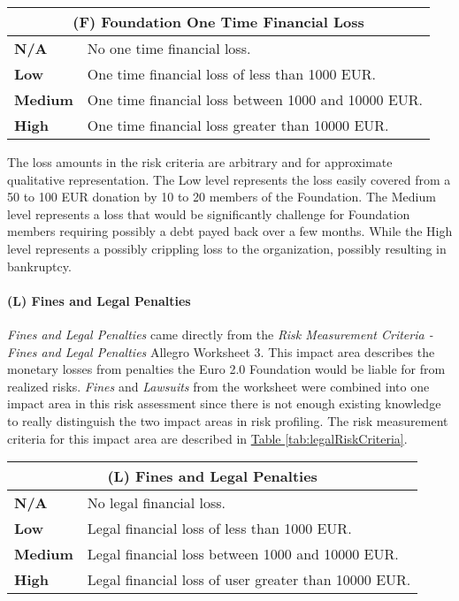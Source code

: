 \documentclass[12pt]{article} %
\newcommand{\hypertableref}[1]{\hyperref[#1]{Table \ref{#1}}}
\begin{document}
{\begin{center}
\begin{tabular}{ | l | p{12cm} | }
  \hline
  \multicolumn{2}{|c|}{\textbf{(F) Foundation One Time Financial Loss}}
  \\ \hline
  \textbf{N/A} & No one time financial loss.
  \\ \hline
  \textbf{Low} & One time financial loss of less than 1000 EUR.
  \\ \hline
  \textbf{Medium} & One time financial loss between 1000 and 10000 EUR.
  \\ \hline
  \textbf{High} & One time financial loss greater than 10000 EUR.
  \\ \hline
\end{tabular}
\end{center}
\label{tab:foundationFinancialLossRiskCriteria}

The loss amounts in the risk criteria are arbitrary and for approximate qualitative representation. The Low level represents the loss easily covered from a 50 to 100 EUR donation by 10 to 20 members of the Foundation. The Medium level represents a loss that would be significantly challenge for Foundation members requiring possibly a debt payed back over a few months. While the High level represents a possibly crippling loss to the organization, possibly resulting in bankruptcy.

\paragraph{(L) Fines and Legal Penalties}

\textit{Fines and Legal Penalties} came directly from the \textit{Risk Measurement Criteria - Fines and Legal Penalties} Allegro Worksheet 3. This impact area describes the monetary losses from penalties the Euro 2.0 Foundation would be liable for from realized risks. \textit{Fines} and \textit{Lawsuits} from the worksheet were combined into one impact area in this risk assessment since there is not enough existing knowledge to really distinguish the two impact areas in risk profiling. The risk measurement criteria for this impact area are described in \hypertableref{tab:legalRiskCriteria}.

\begin{center}
\begin{tabular}{ | l | p{12cm} | }
  \hline
  \multicolumn{2}{|c|}{\textbf{(L) Fines and Legal Penalties}}
  \\ \hline
  \textbf{N/A} & No legal financial loss.
  \\ \hline
  \textbf{Low} & Legal financial loss of less than 1000 EUR.
  \\ \hline
  \textbf{Medium} & Legal financial loss between 1000 and 10000 EUR.
  \\ \hline
  \textbf{High} & Legal financial loss of user greater than 10000 EUR.
  \\ \hline
\end{tabular}
\end{center}
\label{tab:legalRiskCriteria}

}
\end{document}
